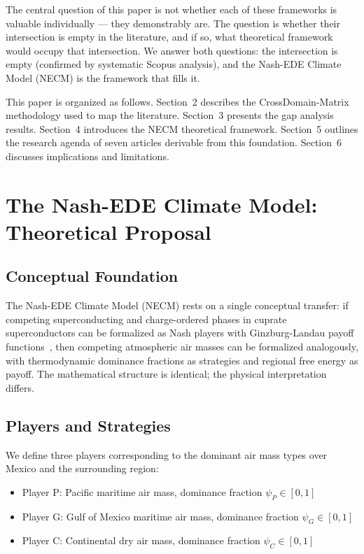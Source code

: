 \documentclass[gmd, manuscript]{copernicus}
\begin{document}
The central question of this paper is not whether each of these
frameworks is valuable individually — they demonstrably are. The question
is whether their intersection is empty in the literature, and if so,
what theoretical framework would occupy that intersection. We answer
both questions: the intersection is empty (confirmed by systematic
Scopus analysis), and the Nash-EDE Climate Model (NECM) is the
framework that fills it.

This paper is organized as follows. Section~2 describes the CrossDomain-Matrix
methodology used to map the literature. Section~3 presents the gap
analysis results. Section~4 introduces the NECM theoretical framework.
Section~5 outlines the research agenda of seven articles derivable from
this foundation. Section~6 discusses implications and limitations.


\section{The Nash-EDE Climate Model: Theoretical Proposal}

\subsection{Conceptual Foundation}

The Nash-EDE Climate Model (NECM) rests on a single conceptual
transfer: if competing superconducting and charge-ordered phases in
cuprate superconductors can be formalized as Nash players with
Ginzburg-Landau payoff functions~\citep{CastilloSanchez2026},
then competing atmospheric air masses can be formalized analogously,
with thermodynamic dominance fractions as strategies and regional
free energy as payoff. The mathematical structure is identical; the
physical interpretation differs.

\subsection{Players and Strategies}

We define three players corresponding to the dominant air mass types
over Mexico and the surrounding region:

\begin{itemize}
\item Player P: Pacific maritime air mass, dominance fraction
      $\psi_P \in [0,1]$
\item Player G: Gulf of Mexico maritime air mass, dominance fraction
      $\psi_G \in [0,1]$
\item Player C: Continental dry air mass, dominance fraction
      $\psi_C \in [0,1]$
\end{itemize}
\end{document}
